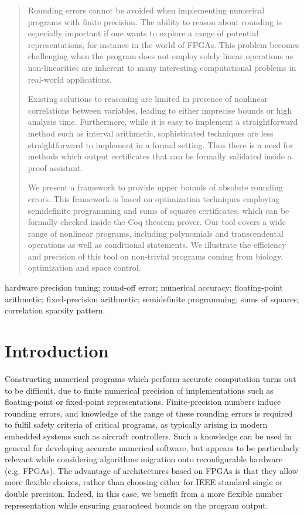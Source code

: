 \documentclass[preprint]{sigplanconf}
\theoremstyle{plain}
\begin{document}
\begin{abstract}

Rounding errors cannot be avoided when implementing numerical programs with finite precision.         
The ability to reason about rounding is especially important if one wants to explore a range of potential representations, for instance in the world of FPGAs. This problem becomes challenging when the program does not employ solely linear operations as non-linearities are inherent to many interesting computational problems in real-world applications. 

Existing solutions to reasoning are limited in presence of nonlinear correlations between variables, leading to either imprecise bounds or high analysis time. Furthermore, while it is easy to implement a straightforward method such as interval arithmetic, sophisticated techniques are less straightforward to implement in a formal setting. Thus there is a need for methods which output certificates that can be formally  validated inside a proof assistant.

We present a framework to provide upper bounds of absolute rounding errors. This framework is based on optimization techniques employing  semidefinite programming and sums of squares certificates, which can be formally checked inside the Coq theorem prover.
Our tool covers a wide range of nonlinear programs, including polynomials and transcendental operations as well as conditional statements.                                                             We illustrate the efficiency and  precision of this tool on non-trivial programs coming from biology, optimization and space control.
\end{abstract}



\keywords
hardware precision tuning; round-off error; numerical accuracy; floating-point arithmetic; fixed-precision arithmetic; semidefinite programming; sums of squares; correlation sparsity pattern.
\section{Introduction} %
\label{sec:intro}
%
Constructing numerical programs which perform accurate computation turns out to be difficult, due to finite numerical precision of implementations such as floating-point or fixed-point representations. Finite-precision numbers induce rounding errors,  and knowledge of the range of these rounding errors is required to fulfil safety criteria of critical programs, as typically arising in modern embedded systems such as aircraft controllers. Such a knowledge can be used in general for developing accurate numerical software, but appears to be particularly relevant while considering algorithms migration onto reconfigurable hardware (e.g. FPGAs). The advantage of architectures based on FPGAs is that they allow more flexible choices, rather than choosing either for IEEE standard single or double precision. Indeed, in this case, we benefit from a more flexible number representation while ensuring guaranteed bounds on the program output. 
\end{document}
